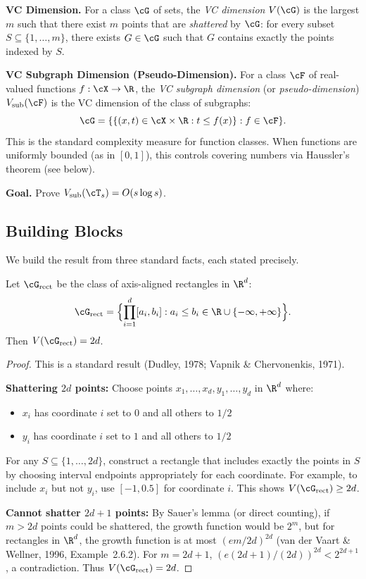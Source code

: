 \documentclass[12pt]{article}
\begin{document}
\noindent\textbf{VC Dimension.}
For a class $\cG$ of sets, the \emph{VC dimension} $V(\cG)$ is the largest $m$ such that there exist $m$ points that are \emph{shattered} by $\cG$: for every subset $S \subseteq \{1,\ldots,m\}$, there exists $G \in \cG$ such that $G$ contains exactly the points indexed by $S$.

\noindent\textbf{VC Subgraph Dimension (Pseudo-Dimension).}
For a class $\cF$ of real-valued functions $f: \cX \to \R$, the \emph{VC subgraph dimension} (or \emph{pseudo-dimension}) $V_{\text{sub}}(\cF)$ is the VC dimension of the class of subgraphs:
\[
\cG = \{ \{ (x,t) \in \cX \times \R : t \le f(x) \} : f \in \cF \}.
\]
This is the standard complexity measure for function classes. When functions are uniformly bounded (as in $[0,1]$), this controls covering numbers via Haussler's theorem (see below).

\noindent\textbf{Goal.}
Prove $V_{\text{sub}}(\cT_s) = O(s \log s)$.

\subsection{Building Blocks}

We build the result from three standard facts, each stated precisely.

\begin{lemma}
\label{lem:vc-rect-app}
Let $\cG_{\text{rect}}$ be the class of axis-aligned rectangles in $\R^d$:
\[
\cG_{\text{rect}} = \Bigl\{ \prod_{i=1}^d [a_i, b_i] : a_i \le b_i \in \R \cup \{-\infty, +\infty\} \Bigr\}.
\]
Then $V(\cG_{\text{rect}}) = 2d$.
\end{lemma}

\begin{proof}
This is a standard result (Dudley, 1978; Vapnik \& Chervonenkis, 1971).

\textbf{Shattering $2d$ points:} Choose points $x_1, \ldots, x_d, y_1, \ldots, y_d$ in $\R^d$ where:
\begin{itemize}
\item $x_i$ has coordinate $i$ set to $0$ and all others to $1/2$
\item $y_i$ has coordinate $i$ set to $1$ and all others to $1/2$
\end{itemize}
For any $S \subseteq \{1,\ldots,2d\}$, construct a rectangle that includes exactly the points in $S$ by choosing interval endpoints appropriately for each coordinate. For example, to include $x_i$ but not $y_i$, use $[-1, 0.5]$ for coordinate $i$. This shows $V(\cG_{\text{rect}}) \ge 2d$.

\textbf{Cannot shatter $2d+1$ points:} By Sauer's lemma (or direct counting), if $m > 2d$ points could be shattered, the growth function would be $2^m$, but for rectangles in $\R^d$, the growth function is at most $(em/2d)^{2d}$ (van der Vaart \& Wellner, 1996, Example~2.6.2). For $m = 2d+1$, $(e(2d+1)/(2d))^{2d} < 2^{2d+1}$, a contradiction. Thus $V(\cG_{\text{rect}}) = 2d$.
\end{proof}
\end{document}
